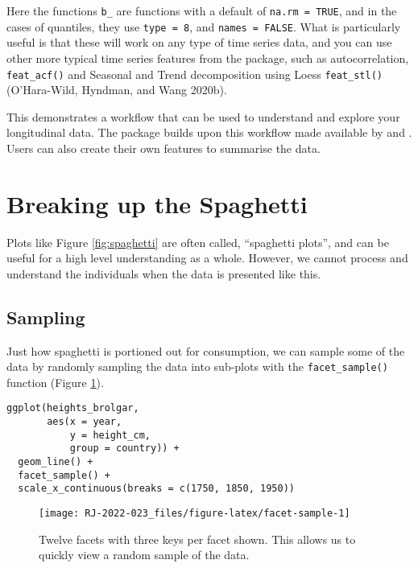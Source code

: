 Here the functions \texttt{b\_} are functions with a default of \texttt{na.rm\ =\ TRUE}, and in
the cases of quantiles, they use \texttt{type\ =\ 8}, and \texttt{names\ =\ FALSE}. What is particularly useful is that these will work on any type of time series data, and you can use other more typical time series features from the  package, such as autocorrelation, \texttt{feat\_acf()} and Seasonal and Trend decomposition using Loess \texttt{feat\_stl()} (O'Hara-Wild, Hyndman, and Wang 2020b).

This demonstrates a workflow that can be used to understand and explore your longitudinal data. The  package builds upon this workflow made available by  and . Users can also create their own features to summarise the data.

\hypertarget{breaking-up-the-spaghetti}{%
\section{Breaking up the Spaghetti}\label{breaking-up-the-spaghetti}}

Plots like Figure \ref{fig:spaghetti} are often called, ``spaghetti plots'', and can be useful for a high level understanding as a whole. However, we cannot process and understand the individuals when the data is presented like this.

\hypertarget{sampling}{%
\subsection{Sampling}\label{sampling}}

Just how spaghetti is portioned out for consumption, we can sample some of the data by randomly sampling the data into sub-plots with the \texttt{facet\_sample()} function (Figure \ref{fig:facet-sample}).

\begin{verbatim}
ggplot(heights_brolgar,
       aes(x = year,
           y = height_cm,
           group = country)) + 
  geom_line() + 
  facet_sample() + 
  scale_x_continuous(breaks = c(1750, 1850, 1950))
\end{verbatim}

\begin{figure}

{\centering \texttt{[image: RJ-2022-023\_files/figure-latex/facet-sample-1]} 

}

\caption{Twelve facets with three keys per facet shown. This allows us to quickly view a random sample of the data.}\label{fig:facet-sample}
\end{figure}

